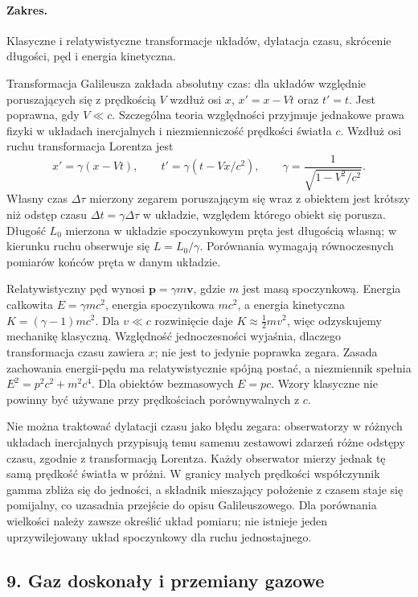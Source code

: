 \documentclass[11pt,a4paper]{article}
\begin{document}
\paragraph{Zakres.} Klasyczne i relatywistyczne transformacje układów, dylatacja czasu, skrócenie długości, pęd i energia kinetyczna.

Transformacja Galileusza zakłada absolutny czas: dla układów względnie poruszających się z prędkością $V$ wzdłuż osi $x$, $x'=x-Vt$ oraz $t'=t$. Jest poprawna, gdy $V\ll c$. Szczególna teoria względności przyjmuje jednakowe prawa fizyki w układach inercjalnych i niezmienniczość prędkości światła $c$. Wzdłuż osi ruchu transformacja Lorentza jest
\[
x'=\gamma(x-Vt),\qquad t'=\gamma(t-Vx/c^2),\qquad
\gamma=\frac{1}{\sqrt{1-V^2/c^2}}.
\]
Własny czas $\Delta\tau$ mierzony zegarem poruszającym się wraz z obiektem jest krótszy niż odstęp czasu $\Delta t=\gamma\Delta\tau$ w układzie, względem którego obiekt się porusza. Długość $L_0$ mierzona w układzie spoczynkowym pręta jest długością własną; w kierunku ruchu obserwuje się $L=L_0/\gamma$. Porównania wymagają równoczesnych pomiarów końców pręta w danym układzie.

Relatywistyczny pęd wynosi $\mathbf p=\gamma m\mathbf v$, gdzie $m$ jest masą spoczynkową. Energia całkowita $E=\gamma mc^2$, energia spoczynkowa $mc^2$, a energia kinetyczna $K=(\gamma-1)mc^2$. Dla $v\ll c$ rozwinięcie daje $K\approx\tfrac12mv^2$, więc odzyskujemy mechanikę klasyczną. Względność jednoczesności wyjaśnia, dlaczego transformacja czasu zawiera $x$; nie jest to jedynie poprawka zegara. Zasada zachowania energii-pędu ma relatywistycznie spójną postać, a niezmiennik spełnia $E^2=p^2c^2+m^2c^4$. Dla obiektów bezmasowych $E=pc$. Wzory klasyczne nie powinny być używane przy prędkościach porównywalnych z $c$.

Nie można traktować dylatacji czasu jako błędu zegara: obserwatorzy w różnych układach inercjalnych przypisują temu samemu zestawowi zdarzeń różne odstępy czasu, zgodnie z transformacją Lorentza. Każdy obserwator mierzy jednak tę samą prędkość światła w próżni. W granicy małych prędkości współczynnik gamma zbliża się do jedności, a składnik mieszający położenie z czasem staje się pomijalny, co uzasadnia przejście do opisu Galileuszowego. Dla porównania wielkości należy zawsze określić układ pomiaru; nie istnieje jeden uprzywilejowany układ spoczynkowy dla ruchu jednostajnego.

\subsection{9. Gaz doskonały i przemiany gazowe}
\end{document}
